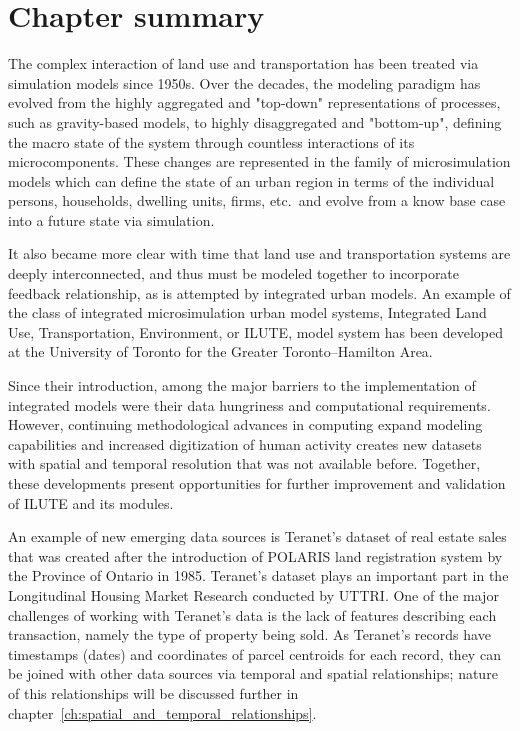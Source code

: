 \section{Chapter summary} \label{sec:background_summary}

The complex interaction of land use and transportation has been treated via simulation models since 1950s.
Over the decades, the modeling paradigm has evolved from the highly aggregated and "top-down" representations of processes, such as gravity-based models, to highly disaggregated and "bottom-up", defining the macro state of the system through countless interactions of its microcomponents.
These changes are represented in the family of microsimulation models which can define the state of an urban region in terms of the individual persons, households, dwelling units, firms, etc.\ and evolve from a know base case into a future state via simulation.

It also became more clear with time that land use and transportation systems are deeply interconnected, and thus must be modeled together to incorporate feedback relationship, as is attempted by integrated urban models.
An example of the class of integrated microsimulation urban model systems, Integrated Land Use, Transportation, Environment, or ILUTE, model system has been developed at the University of Toronto for the Greater Toronto--Hamilton Area.

Since their introduction, among the major barriers to the implementation of integrated models were their data hungriness and computational requirements.
However, continuing methodological advances in computing expand modeling capabilities and increased digitization of human activity creates new datasets with spatial and temporal resolution that was not available before.
Together, these developments present opportunities for further improvement and validation of ILUTE and its modules.

An example of new emerging data sources is Teranet's dataset of real estate sales that was created after the introduction of POLARIS land registration system by the Province of Ontario in 1985.
Teranet's dataset plays an important part in the Longitudinal Housing Market Research conducted by UTTRI.
One of the major challenges of working with Teranet's data is the lack of features describing each transaction, namely the type of property being sold.
As Teranet's records have timestamps (dates) and coordinates of parcel centroids for each record, they can be joined with other data sources via temporal and spatial relationships;
nature of this relationships will be discussed further in chapter~\ref{ch:spatial_and_temporal_relationships}.
